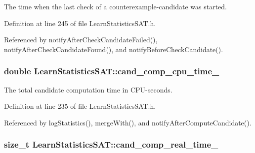 The time when the last check of a counterexample-\/candidate was started. 



Definition at line 245 of file Learn\-Statistics\-S\-A\-T.\-h.



Referenced by notify\-After\-Check\-Candidate\-Failed(), notify\-After\-Check\-Candidate\-Found(), and notify\-Before\-Check\-Candidate().

\hypertarget{classLearnStatisticsSAT_af977c00fbf0f9978f92dd5c997577a06}{
\subsubsection[{cand\-\_\-comp\-\_\-cpu\-\_\-time\-\_\-}]{\setlength{\rightskip}{0pt plus 5cm}double Learn\-Statistics\-S\-A\-T\-::cand\-\_\-comp\-\_\-cpu\-\_\-time\-\_\-\hspace{0.3cm}{\ttfamily [protected]}}}\label{classLearnStatisticsSAT_af977c00fbf0f9978f92dd5c997577a06}


The total candidate computation time in C\-P\-U-\/seconds. 



Definition at line 235 of file Learn\-Statistics\-S\-A\-T.\-h.



Referenced by log\-Statistics(), merge\-With(), and notify\-After\-Compute\-Candidate().

\hypertarget{classLearnStatisticsSAT_a278872231b15ff010ae4e3a60e8d8f11}{
\subsubsection[{cand\-\_\-comp\-\_\-real\-\_\-time\-\_\-}]{\setlength{\rightskip}{0pt plus 5cm}size\-\_\-t Learn\-Statistics\-S\-A\-T\-::cand\-\_\-comp\-\_\-real\-\_\-time\-\_\-\hspace{0.3cm}{\ttfamily [protected]}}}\label{classLearnStatisticsSAT_a278872231b15ff010ae4e3a60e8d8f11}


